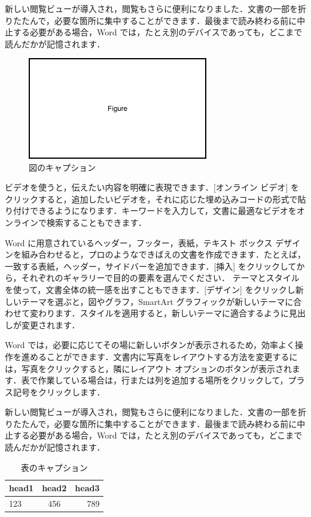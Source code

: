 新しい閲覧ビューが導入され，閲覧もさらに便利になりました．文書の一部を折りたたんで，必要な箇所に集中することができます．最後まで読み終わる前に中止する必要がある場合，Word では，たとえ別のデバイスであっても，どこまで読んだかが記憶されます．

\begin{figure}
    \centering
    \includegraphics[width=0.7\textwidth]{fig1.png}
    \caption{図のキャプション}
    \label{fig:my_label}
\end{figure}

ビデオを使うと，伝えたい内容を明確に表現できます．[オンライン ビデオ] をクリックすると，追加したいビデオを，それに応じた埋め込みコードの形式で貼り付けできるようになります．キーワードを入力して，文書に最適なビデオをオンラインで検索することもできます．

Word に用意されているヘッダー，フッター，表紙，テキスト ボックス デザインを組み合わせると，プロのようなできばえの文書を作成できます．たとえば，一致する表紙，ヘッダー，サイドバーを追加できます．[挿入] をクリックしてから，それぞれのギャラリーで目的の要素を選んでください．
テーマとスタイルを使って，文書全体の統一感を出すこともできます．[デザイン] をクリックし新しいテーマを選ぶと，図やグラフ，SmartArt グラフィックが新しいテーマに合わせて変わります．スタイルを適用すると，新しいテーマに適合するように見出しが変更されます．

Word では，必要に応じてその場に新しいボタンが表示されるため，効率よく操作を進めることができます．文書内に写真をレイアウトする方法を変更するには，写真をクリックすると，隣にレイアウト オプションのボタンが表示されます．表で作業している場合は，行または列を追加する場所をクリックして，プラス記号をクリックします．

新しい閲覧ビューが導入され，閲覧もさらに便利になりました．文書の一部を折りたたんで，必要な箇所に集中することができます．最後まで読み終わる前に中止する必要がある場合，Word では，たとえ別のデバイスであっても，どこまで読んだかが記憶されます．

\begin{table}[htb]
    \caption{表のキャプション}
    \centering
    \begin{tabular}{lcr}
        \hline
        head1 & head2 & head3 \\ 
        \hline\hline
        123 & 456 & 789\\
        \hline
    \end{tabular}
    \label{tab:my_label}
\end{table}

